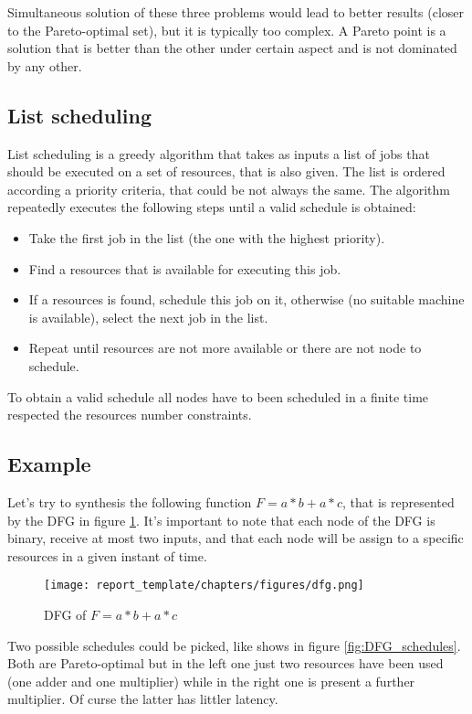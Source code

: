 Simultaneous solution of these three problems would lead to better results (closer to the Pareto-optimal set), but it is typically too complex.
A Pareto point is a solution that is better than the other under certain aspect and is not dominated by any other.

\subsection{List scheduling}
\label{list_scheduling}

List scheduling is a greedy algorithm that takes as inputs a list of jobs that should be executed on a set of resources, that is also given. The list is ordered according a priority criteria, that could be not always the same. The algorithm repeatedly executes the following steps until a valid schedule is obtained:
\begin{itemize}
    \item Take the first job in the list (the one with the highest priority).
    \item Find a resources that is available for executing this job.
    \item If a resources is found, schedule this job on it, otherwise (no suitable machine is available), select the next job in the list.
    \item Repeat until resources are not more available or there are not node to schedule.
\end{itemize}

To obtain a valid schedule all nodes have to been scheduled in a finite time respected the resources number constraints.

\subsection{Example}
Let's try to synthesis the following function $F = a*b + a*c$, that is represented by the DFG in figure \ref{fig:DFG}. It's important to note that each node of the DFG is binary, receive at most two inputs, and that each node will be assign to a specific resources in a given instant of time.

\begin{figure}[h]
\centering
\texttt{[image: report\_template/chapters/figures/dfg.png]}
\caption{DFG of $F = a*b + a*c$}
\label{fig:DFG}
\end{figure}

Two possible schedules could be picked, like shows in figure \ref{fig:DFG_schedules}. Both are Pareto-optimal but in the left one just two resources have been used (one adder and one multiplier) while in the right one is present a further multiplier. Of curse the latter has littler latency.
 
